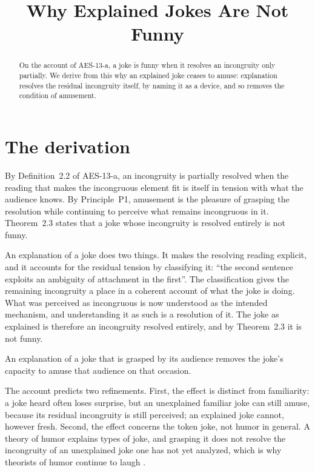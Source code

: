 \documentclass{situationist-preprint}
\title{Why Explained Jokes Are Not Funny}
\begin{document}
\maketitle
\vspace{-1em}

\begin{abstract}
On the account of AES-13-a, a joke is funny when it resolves an incongruity only partially. We derive from this why an explained joke ceases to amuse: explanation resolves the residual incongruity itself, by naming it as a device, and so removes the condition of amusement.
\end{abstract}

\section{The derivation}

By Definition~2.2 of AES-13-a, an incongruity is partially resolved when the reading that makes the incongruous element fit is itself in tension with what the audience knows. By Principle~P1, amusement is the pleasure of grasping the resolution while continuing to perceive what remains incongruous in it. Theorem~2.3 states that a joke whose incongruity is resolved entirely is not funny.

An explanation of a joke does two things. It makes the resolving reading explicit, and it accounts for the residual tension by classifying it: \enquote{the second sentence exploits an ambiguity of attachment in the first}. The classification gives the remaining incongruity a place in a coherent account of what the joke is doing. What was perceived as incongruous is now understood as the intended mechanism, and understanding it as such is a resolution of it. The joke as explained is therefore an incongruity resolved entirely, and by Theorem~2.3 it is not funny.

\begin{proposition}\label{p:expl}
An explanation of a joke that is grasped by its audience removes the joke's capacity to amuse that audience on that occasion.
\end{proposition}

The account predicts two refinements. First, the effect is distinct from familiarity: a joke heard often loses surprise, but an unexplained familiar joke can still amuse, because its residual incongruity is still perceived; an explained joke cannot, however fresh. Second, the effect concerns the token joke, not humor in general. A theory of humor explains types of joke, and grasping it does not resolve the incongruity of an unexplained joke one has not yet analyzed, which is why theorists of humor continue to laugh \citep{Carroll2014,HurleyDennettAdams2011}.
\end{document}
